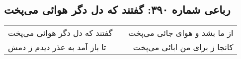 \begin{center}
\section*{رباعی شماره ۳۹۰: گفتند که دل دگر هوائی می‌پخت}
\label{sec:0390}
\begin{longtable}{l p{0.5cm} r}
گفتند که دل دگر هوائی می‌پخت
&&
از ما بشد و هوای جائی می‌پخت
\\
تا باز آمد به عذر دیدم ز دمش
&&
کانجا ز برای من ابائی می‌پخت
\\
\end{longtable}
\end{center}
